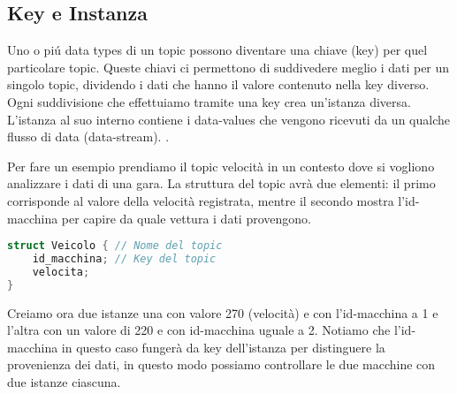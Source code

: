 \subsection{Key e Instanza}
Uno o piú data types di un topic possono diventare una chiave (key) per 
quel particolare topic. Queste chiavi ci permettono di suddivedere meglio
i dati per un singolo topic, dividendo i dati che hanno il valore contenuto
nella key diverso. Ogni suddivisione che effettuiamo tramite una key crea 
un'istanza diversa. L'istanza al suo interno contiene i data-values che 
vengono ricevuti da un qualche flusso di data (data-stream).
 \cite{Instance81:online}.

Per fare un esempio prendiamo il topic velocità in un contesto dove si
vogliono analizzare i dati di una gara.
La struttura del topic avrà due elementi: il primo corrisponde al valore
della velocità registrata, mentre il secondo mostra l'id-macchina per 
capire da quale vettura i dati provengono.

\vspace{5mm} %
\begin{lstlisting}[language=C++, caption=Esempio di Topic con una key
    usando il linguaggio IDL
    , label=Topic struct,
    captionpos=b]
struct Veicolo { // Nome del topic
    id_macchina; // Key del topic
    velocita;
}
\end{lstlisting}
\vspace{5mm}

Creiamo ora due istanze una con valore 270 (velocità) e con 
l'id-macchina a 1 e l'altra con un valore di 220 e con id-macchina 
uguale a 2. Notiamo che l'id-macchina in questo caso fungerà da key 
dell'istanza per distinguere la provenienza dei dati, in questo
modo possiamo controllare le due macchine con due istanze ciascuna.



    


